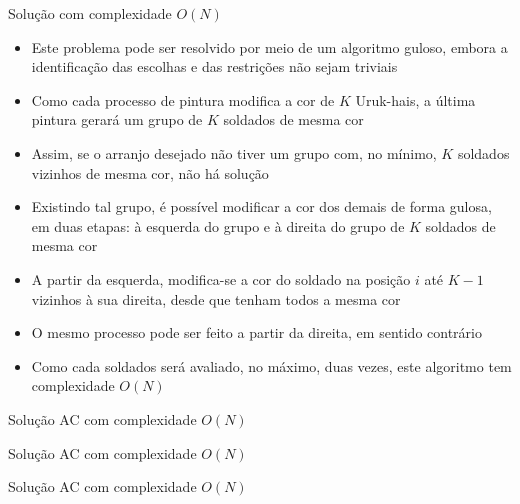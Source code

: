 \begin{frame}[fragile]{Solução com complexidade $O(N)$}

    \begin{itemize}
        \item Este problema pode ser resolvido por meio de um algoritmo guloso, embora a
            identificação das escolhas e das restrições não sejam triviais

        \item Como cada processo de pintura modifica a cor de $K$ Uruk-hais, a última pintura
            gerará um grupo de $K$ soldados de mesma cor

        \item Assim, se o arranjo desejado não tiver um grupo com, no mínimo, $K$ soldados
            vizinhos de mesma cor, não há solução

        \item Existindo tal grupo, é possível modificar a cor dos demais de forma gulosa,
            em duas etapas: à esquerda do grupo e à direita do grupo de $K$ soldados de mesma cor

        \item A partir da esquerda, modifica-se a cor do soldado na posição $i$ até $K - 1$ 
            vizinhos à sua direita, desde que tenham todos a mesma cor

        \item O mesmo processo pode ser feito a partir da direita, em sentido contrário

        \item Como cada soldados será avaliado, no máximo, duas vezes, este algoritmo tem
            complexidade $O(N)$
   \end{itemize}

\end{frame}

\begin{frame}[fragile]{Solução AC com complexidade $O(N)$}
\end{frame}

\begin{frame}[fragile]{Solução AC com complexidade $O(N)$}
\end{frame}

\begin{frame}[fragile]{Solução AC com complexidade $O(N)$}
\end{frame}




